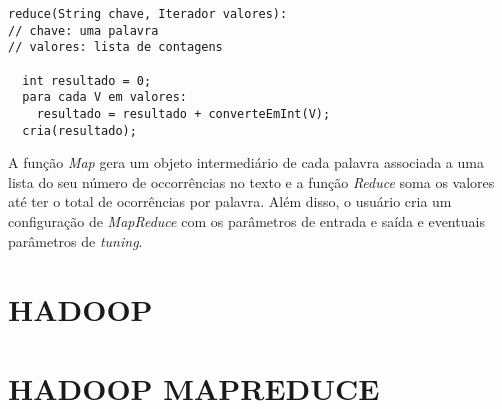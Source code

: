 \begin{lstlisting}[title={Código 2: Exemplo de função Reduce em pseudocódigo adaptado de \cite{MapReduce08}}]
reduce(String chave, Iterador valores):
// chave: uma palavra
// valores: lista de contagens

  int resultado = 0;
  para cada V em valores:
    resultado = resultado + converteEmInt(V);
  cria(resultado);
\end{lstlisting}

A função \textit{Map} gera um objeto intermediário de cada palavra associada a uma lista do seu número de occorrências no texto e a função \textit{Reduce} soma os valores até ter o total de ocorrências por palavra. Além disso, o usuário cria um configuração de \textit{MapReduce} com os parâmetros de entrada e saída e eventuais parâmetros de \textit{tuning}.

\section{HADOOP} \label{sec:hadoop}

\section{HADOOP MAPREDUCE} \label{sec:hadoopmapreduce}
